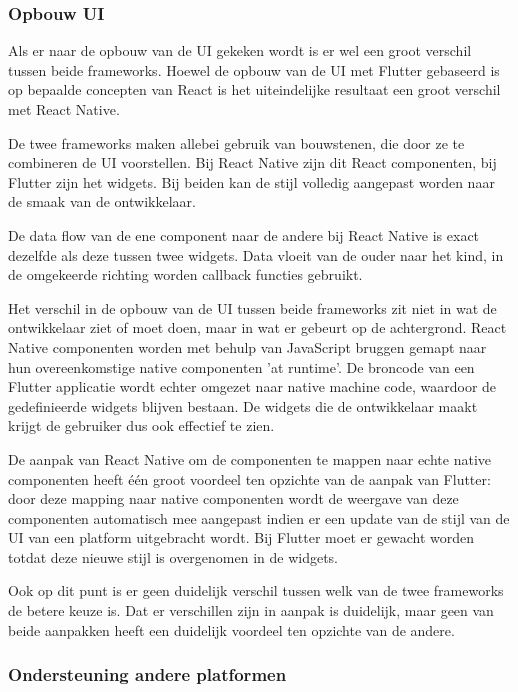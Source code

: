 \subsubsection{Opbouw UI}

Als er naar de opbouw van de UI gekeken wordt is er wel een groot verschil tussen beide frameworks. Hoewel de opbouw van de UI met Flutter gebaseerd is op bepaalde concepten van React is het uiteindelijke resultaat een groot verschil met React Native.

De twee frameworks maken allebei gebruik van bouwstenen, die door ze te combineren de UI voorstellen. Bij React Native zijn dit React componenten, bij Flutter zijn het widgets. Bij beiden kan de stijl volledig aangepast worden naar de smaak van de ontwikkelaar. 

De data flow van de ene component naar de andere bij React Native is exact dezelfde als deze tussen twee widgets. Data vloeit van de ouder naar het kind, in de omgekeerde richting worden callback functies gebruikt.

Het verschil in de opbouw van de UI tussen beide frameworks zit niet in wat de ontwikkelaar ziet of moet doen, maar in wat er gebeurt op de achtergrond. React Native componenten worden met behulp van JavaScript bruggen gemapt naar hun overeenkomstige native componenten 'at runtime'. De broncode van een Flutter applicatie wordt echter omgezet naar native machine code, waardoor de gedefinieerde widgets blijven bestaan. De widgets die de ontwikkelaar maakt krijgt de gebruiker dus ook effectief te zien. 

De aanpak van React Native om de componenten te mappen naar echte native componenten heeft één groot voordeel ten opzichte van de aanpak van Flutter: door deze mapping naar native componenten wordt de weergave van deze componenten automatisch mee aangepast indien er een update van de stijl van de UI van een platform uitgebracht wordt. Bij Flutter moet er gewacht worden totdat deze nieuwe stijl is overgenomen in de widgets. 

Ook op dit punt is er geen duidelijk verschil tussen welk van de twee frameworks de betere keuze is. Dat er verschillen zijn in aanpak is duidelijk, maar geen van beide aanpakken heeft een duidelijk voordeel ten opzichte van de andere. 

\subsubsection{Ondersteuning andere platformen}

